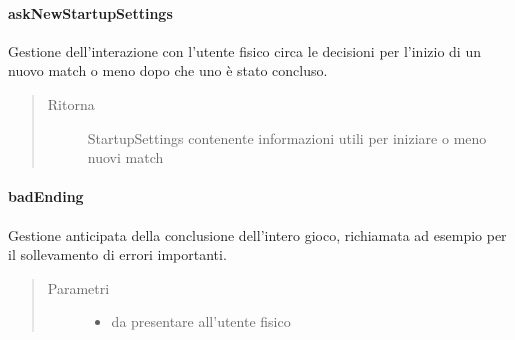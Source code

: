 \documentclass[letterpaper,10pt,italian,openany,oneside]{sphinxmanual}
\begin{document}
\paragraph{askNewStartupSettings}
\label{\detokenize{source/it/unicam/cs/pa/mastermind/ui/StartView:asknewstartupsettings}}

\begin{fulllineitems}
\label{\detokenize{source/it/unicam/cs/pa/mastermind/ui/StartView:it.unicam.cs.pa.mastermind.ui.StartView.askNewStartupSettings()}}
Gestione dell’interazione con l’utente fisico circa le decisioni per l’inizio di un nuovo match o meno dopo che uno è stato concluso.
\begin{quote}\begin{description}
\item[{Ritorna}] \leavevmode
StartupSettings contenente informazioni utili per iniziare o meno nuovi match

\end{description}\end{quote}

\end{fulllineitems}



\paragraph{badEnding}
\label{\detokenize{source/it/unicam/cs/pa/mastermind/ui/StartView:badending}}

\begin{fulllineitems}
\label{\detokenize{source/it/unicam/cs/pa/mastermind/ui/StartView:it.unicam.cs.pa.mastermind.ui.StartView.badEnding(String)}}
Gestione anticipata della conclusione dell’intero gioco, richiamata ad esempio per il sollevamento di errori importanti.
\begin{quote}\begin{description}
\item[{Parametri}] \leavevmode\begin{itemize}
\item {} 
 \textendash{} da presentare all’utente fisico

\end{itemize}

\end{description}\end{quote}

\end{fulllineitems}
\end{document}
